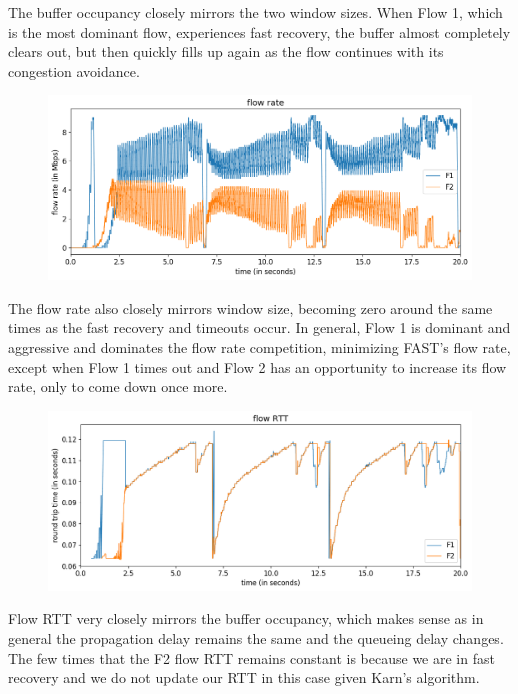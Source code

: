 \documentclass{article}
\begin{document}
The buffer occupancy closely mirrors the two window sizes. When Flow 1, which is the most dominant flow, experiences fast recovery, the buffer almost completely clears out, but then quickly fills up again as the flow continues with its congestion avoidance.

\begin{figure}[H]
\centering
\includegraphics[width = \textwidth]{test_case4 flow rate.png}
\end{figure}

The flow rate also closely mirrors window size, becoming zero around the same times as the fast recovery and timeouts occur. In general, Flow 1 is dominant and aggressive and dominates the flow rate competition, minimizing FAST's flow rate, except when Flow 1 times out and Flow 2 has an opportunity to increase its flow rate, only to come down once more.

\begin{figure}[H]
\centering
\includegraphics[width = \textwidth]{test_case4 flow RTT.png}
\end{figure}

Flow RTT very closely mirrors the buffer occupancy, which makes sense as in general the propagation delay remains the same and the queueing delay changes. The few times that the F2 flow RTT remains constant is because we are in fast recovery and we do not update our RTT in this case given Karn's algorithm.
\end{document}
